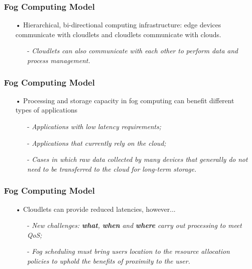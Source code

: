 \documentclass[10pt, pdf, xcolor=pdftex, dvipsnames, table]{beamer}
\begin{document}
\begin{frame}
	\frametitle{Fog Computing Model}
 	\begin{block}{}
 		\begin{itemize}
 		     \item[•] Hierarchical, bi-directional computing infrastructure: edge devices communicate with cloudlets and cloudlets communicate with clouds.\newline
 		    	\begin{itemize}
 		    		\item[-] \footnotesize\textit{Cloudlets can also communicate with each other to perform data and process management.}
 		    	\end{itemize}
 		\end{itemize}
 	\end{block}
\end{frame}

\begin{frame}
	\frametitle{Fog Computing Model}
 	\begin{block}{}
 		\begin{itemize}
 		     \item[•] Processing and storage capacity in fog computing can benefit different types of applications\newline
 		    	\begin{itemize}
 		    		\item[-] \footnotesize\textit{Applications with low latency requirements;}\newline
 		    		\item[-] \footnotesize\textit{Applications that currently rely on the cloud;}\newline
 		    		\item[-] \footnotesize\textit{Cases in which raw data collected by many devices that generally do not need to be transferred to the cloud for long-term storage.}
 		    	\end{itemize}
 		\end{itemize}
 	\end{block}
\end{frame}

\begin{frame}
	\frametitle{Fog Computing Model}
 	\begin{block}{}
 		\begin{itemize}
 		     \item[•] Cloudlets can provide reduced latencies, however...\newline
 		    	\begin{itemize}
 		    		\item[-] \footnotesize\textit{New challenges: \textbf{what}, \textbf{when} and \textbf{where} carry out processing to meet QoS;}\newline
 		    		\item[-] \footnotesize\textit{Fog scheduling must bring users location to the resource allocation policies to uphold the benefits of proximity to the user.}
 		    	\end{itemize}
 		\end{itemize}
 	\end{block}
\end{frame}
\end{document}
